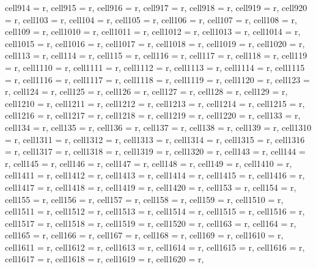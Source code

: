 \documentclass[journal]{IEEEtran}
\begin{document}
\begin{table}
\begin{adjustbox}{width=\textwidth}
\begin{tblr}
{  cell{9}{14} = {r},  cell{9}{15} = {r},  cell{9}{16} = {r},  cell{9}{17} = {r},  cell{9}{18} = {r},  cell{9}{19} = {r},  cell{9}{20} = {r},  cell{10}{3} = {r},  cell{10}{4} = {r},  cell{10}{5} = {r},  cell{10}{6} = {r},  cell{10}{7} = {r},  cell{10}{8} = {r},  cell{10}{9} = {r},  cell{10}{10} = {r},  cell{10}{11} = {r},  cell{10}{12} = {r},  cell{10}{13} = {r},  cell{10}{14} = {r},  cell{10}{15} = {r},  cell{10}{16} = {r},  cell{10}{17} = {r},  cell{10}{18} = {r},  cell{10}{19} = {r},  cell{10}{20} = {r},  cell{11}{3} = {r},  cell{11}{4} = {r},  cell{11}{5} = {r},  
  cell{11}{6} = {r},  cell{11}{7} = {r},  cell{11}{8} = {r},  cell{11}{9} = {r},  cell{11}{10} = {r},  cell{11}{11} = {r},  cell{11}{12} = {r},  cell{11}{13} = {r},  cell{11}{14} = {r},  cell{11}{15} = {r},  cell{11}{16} = {r},  cell{11}{17} = {r},  cell{11}{18} = {r},  cell{11}{19} = {r},  cell{11}{20} = {r},  cell{12}{3} = {r},  cell{12}{4} = {r},  cell{12}{5} = {r},  cell{12}{6} = {r},  cell{12}{7} = {r},  cell{12}{8} = {r},  cell{12}{9} = {r},  cell{12}{10} = {r},  cell{12}{11} = {r},  cell{12}{12} = {r},  cell{12}{13} = {r},  cell{12}{14} = {r},  cell{12}{15} = {r},  
  cell{12}{16} = {r},  cell{12}{17} = {r},  cell{12}{18} = {r},  cell{12}{19} = {r},  cell{12}{20} = {r},  cell{13}{3} = {r},  cell{13}{4} = {r},  cell{13}{5} = {r},  cell{13}{6} = {r},  cell{13}{7} = {r},  cell{13}{8} = {r},  cell{13}{9} = {r},  cell{13}{10} = {r},  cell{13}{11} = {r},  cell{13}{12} = {r},  cell{13}{13} = {r},  cell{13}{14} = {r},  cell{13}{15} = {r},  cell{13}{16} = {r},  cell{13}{17} = {r},  cell{13}{18} = {r},  cell{13}{19} = {r},  cell{13}{20} = {r},  cell{14}{3} = {r},  cell{14}{4} = {r},  cell{14}{5} = {r},  cell{14}{6} = {r},  cell{14}{7} = {r},  
  cell{14}{8} = {r},  cell{14}{9} = {r},  cell{14}{10} = {r},  cell{14}{11} = {r},  cell{14}{12} = {r},  cell{14}{13} = {r},  cell{14}{14} = {r},  cell{14}{15} = {r},  cell{14}{16} = {r},  cell{14}{17} = {r},  cell{14}{18} = {r},  cell{14}{19} = {r},  cell{14}{20} = {r},  cell{15}{3} = {r},  cell{15}{4} = {r},  cell{15}{5} = {r},  cell{15}{6} = {r},  cell{15}{7} = {r},  cell{15}{8} = {r},  cell{15}{9} = {r},  cell{15}{10} = {r},  cell{15}{11} = {r},  cell{15}{12} = {r},  cell{15}{13} = {r},  cell{15}{14} = {r},  cell{15}{15} = {r},  cell{15}{16} = {r},  cell{15}{17} = {r},  
  cell{15}{18} = {r},  cell{15}{19} = {r},  cell{15}{20} = {r},  cell{16}{3} = {r},  cell{16}{4} = {r},  cell{16}{5} = {r},  cell{16}{6} = {r},  cell{16}{7} = {r},  cell{16}{8} = {r},  cell{16}{9} = {r},  cell{16}{10} = {r},  cell{16}{11} = {r},  cell{16}{12} = {r},  cell{16}{13} = {r},  cell{16}{14} = {r},  cell{16}{15} = {r},  cell{16}{16} = {r},  cell{16}{17} = {r},  cell{16}{18} = {r},  cell{16}{19} = {r},  cell{16}{20} = {r},  
}
\end{tblr}
\end{adjustbox}
\end{table}
\end{document}
